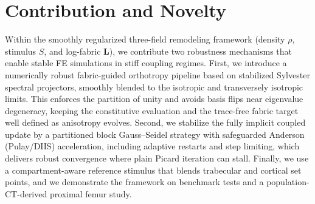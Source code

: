 \section*{Contribution and Novelty}
\label{sec:contribution-novelty}
Within the smoothly regularized three-field remodeling framework (density $\rho$, stimulus $S$, and log-fabric $\mathbf{L}$), we contribute two robustness mechanisms that enable stable FE simulations in stiff coupling regimes. First, we introduce a numerically robust fabric-guided orthotropy pipeline based on stabilized Sylvester spectral projectors, smoothly blended to the isotropic and transversely isotropic limits. This enforces the partition of unity and avoids basis flips near eigenvalue degeneracy, keeping the constitutive evaluation and the trace-free fabric target well defined as anisotropy evolves.
Second, we stabilize the fully implicit coupled update by a partitioned block Gauss--Seidel strategy with safeguarded Anderson (Pulay/DIIS) acceleration, including adaptive restarts and step limiting, which delivers robust convergence where plain Picard iteration can stall. Finally, we use a compartment-aware reference stimulus that blends trabecular and cortical set points, and we demonstrate the framework on benchmark tests and a population-CT-derived proximal femur study.
